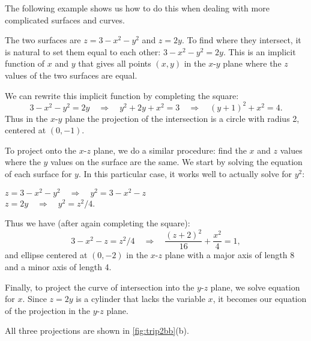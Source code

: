 The following example shows us how to do this when dealing with more complicated surfaces and curves.


{The two surfaces are $z=3-x^2-y^2$ and $z=2y$. To find where they intersect, it is natural to set them equal to each other: $3-x^2-y^2=2y$. This is an implicit function of $x$ and $y$ that gives all points $(x,y)$ in the $x$-$y$ plane where the $z$ values of the two surfaces are equal. 

We can rewrite this implicit function by completing the square:
\[3-x^2-y^2=2y \quad \Rightarrow \quad y^2+2y+x^2=3\quad \Rightarrow \quad (y+1)^2+x^2=4.\]
Thus in the $x$-$y$ plane the projection of the intersection is a circle with radius 2, centered at $(0,-1)$.

To project onto the $x$-$z$ plane, we do a similar procedure: find the $x$ and $z$ values where the $y$ values on the surface are the same. We start by solving the equation of each surface for $y$. In this particular case, it works well to actually solve for $y^2$:

\noindent $z=3-x^2-y^2 \quad \Rightarrow \quad y^2=3-x^2-z$\\
\noindent $z=2y \quad \Rightarrow \quad y^2=z^2/4$.

Thus we have (after again completing the square):
\[3-x^2-z = z^2/4 \quad \Rightarrow\quad \frac{(z+2)^2}{16}+\frac{x^2}4=1,\]
and ellipse centered at $(0,-2)$ in the $x$-$z$ plane with a major axis of length 8 and a minor axis of length 4. 

Finally, to project the curve of intersection into the $y$-$z$ plane, we solve equation for $x$. Since $z=2y$ is a cylinder that lacks the variable $x$, it becomes our equation of the projection in the $y$-$z$ plane.

All three projections are shown in \autoref{fig:trip2bb}(b).}

